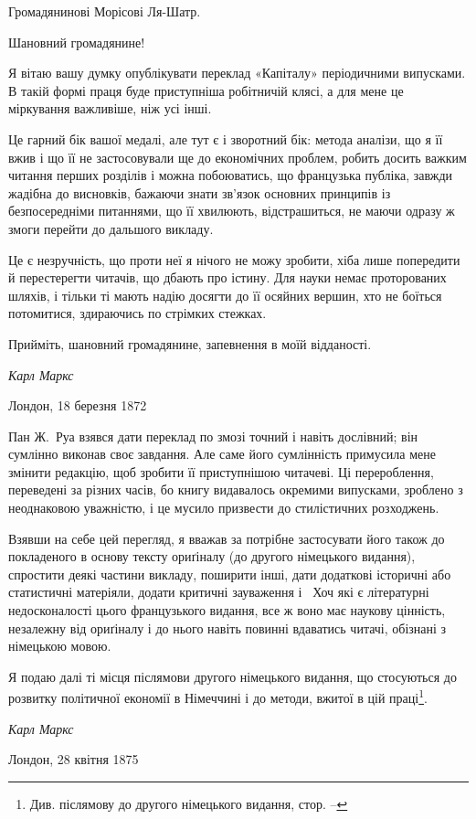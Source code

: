 


\begin{center}
Громадянинові Морісові Ля-Шатр.
\end{center}

Шановний громадянине!

Я вітаю вашу думку опублікувати переклад «Капіталу» періодичними
випусками. В такій формі праця буде приступніша
робітничій клясі, а для мене це міркування важливіше, ніж
усі інші.

Це гарний бік вашої медалі, але тут є і зворотний бік: метода
аналізи, що я її вжив і що її не застосовували ще до економічних
проблем, робить досить важким читання перших розділів і можна
побоюватись, що французька публіка, завжди жадібна до висновків,
бажаючи знати зв’язок основних принципів із безпосередніми
питаннями, що її хвилюють, відстрашиться, не маючи одразу ж
змоги перейти до дальшого викладу.

Це є незручність, що проти неї я нічого не можу зробити, хіба
лише попередити й перестерегти читачів, що дбають про істину.
Для науки немає проторованих шляхів, і тільки ті мають надію
досягти до її осяйних вершин, хто не боїться потомитися, здираючись
по стрімких стежках.

Прийміть, шановний громадянине, запевнення в моїй відданості.

\begin{flushright}
\emph{Карл Маркс}
\end{flushright}

{\small Лондон, 18 березня 1872}


Пан Ж.~Руа взявся дати переклад по змозі точний і навіть
дослівний; він сумлінно виконав своє завдання. Але саме його
сумлінність примусила мене змінити редакцію, щоб зробити її
приступнішою читачеві. Ці перероблення, переведені за різних
часів, бо книгу видавалось окремими випусками, зроблено з
неоднаковою уважністю, і це мусило призвести до стилістичних
розходжень.

Взявши на себе цей перегляд, я вважав за потрібне застосувати
його також до покладеного в основу тексту ориґіналу (до другого
німецького видання), спростити деякі частини викладу, поширити
інші, дати додаткові історичні або статистичні матеріяли, додати
критичні зауваження і~ Хоч які є літературні недосконалості
цього французького видання, все ж воно має наукову цінність,
незалежну від ориґіналу і до нього навіть повинні вдаватись
читачі, обізнані з німецькою мовою.

Я подаю далі ті місця післямови другого німецького видання,
що стосуються до розвитку політичної економії в Німеччині і до
методи, вжитої в цій праці\footnote*{
Див. післямову до другого німецького видання, стор. \pageref{original-81}--\pageref{original-88} 
}.

\begin{flushright}
\emph{Карл Маркс}
\end{flushright}

{\small Лондон, 28 квітня 1875~}
